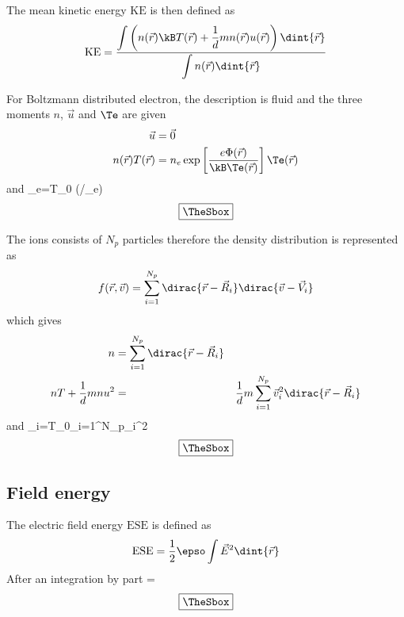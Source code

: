 \documentclass[10pt,a4paper]{article}
\newlength{\mylength}
\newenvironment{falign}%
{\setlength{\fboxsep}{15pt}
\setlength{\fboxrule}{0.5pt}
\setlength{\mylength}{\textwidth}
\addtolength{\mylength}{-2\fboxsep}
\addtolength{\mylength}{-2\fboxrule}
\Sbox
\minipage{\mylength}%
  \setlength{\abovedisplayskip}{-2\lineskip}
	\setlength{\belowdisplayskip}{-2\lineskip}
\align}%
{\endalign\endminipage\endSbox
\[\fbox{\TheSbox}\]}
\begin{document}
The mean kinetic energy $\mathrm{KE}$ is then defined as
\begin{equation}
\mathrm{KE}=\frac{\displaystyle\int\left(n(\vec{r})\kB T(\vec{r})
+\frac{1}{d}mn(\vec{r})u(\vec{r})\right)\dint{\vec{r}}}
{\displaystyle\int n(\vec{r})\dint{\vec{r}}}
\end{equation}

For Boltzmann distributed electron, the description is fluid and the 
three moments $n$, $\vec{u}$ and $\Te$ are given 
\begin{align}
\vec{u}&=\vec{0}\\
n(\vec{r})T(\vec{r})&=n_e
\exp\left[\frac{e\Phi(\vec{r})}{\kB\Te(\vec{r})}\right]\Te(\vec{r})
\end{align}
and
\begin{falign}
_e=\kB T_0
{\displaystyle\int\exp\left({\phi/\theta_e}\right)\dint{\vec{\xi}}}
\end{falign}

The ions consists of $N_p$ particles therefore the density distribution
is represented as 
\begin{equation}
f(\vec{r},\vec{v})= \sum_{i=1}^{N_p}
\dirac{\vec{r}-\vec{R}_i}\dirac{\vec{v}-\vec{V}_i}
\end{equation}
which gives
\begin{align}
n&=\sum_{i=1}^{N_p}\dirac{\vec{r}-\vec{R}_i}\\
nT+\frac{1}{d}mnu^2&=&\frac{1}{d}m\sum_{i=1}^{N_p}\vec{v}_i^2
\dirac{\vec{r}-\vec{R}_i}
\end{align}
and
\begin{falign}
_i=\kB T_0\sum_{i=1}^{N_p}\vec{\psi}_i^2 
\end{falign}

\subsection{Field energy}
The electric field energy $\mathrm{ESE}$ is defined as
\begin{equation}
\mathrm{ESE}=\frac{1}{2}\epso\int\vec{E}^2\dint{\vec{r}}
\end{equation}
After an integration by part 
\begin{falign}
=\int\phi
{}
\dint{\vec{\xi}}
\end{falign}
\end{document}
